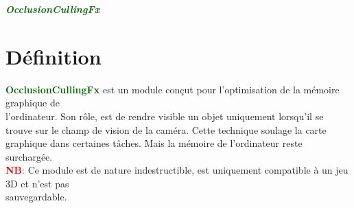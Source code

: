 \documentclass[a4paper, 11pt]{article}
\begin{document}
	\pagecolor{silver}
	\huge{\hspace{12cm}\textit{\textbf{\textcolor{darkgreen}{OcclusionCullingFx}}}}\large{} \tableofcontents
	\newpage
	\section{Définition}
	\textcolor{darkgreen}{\textbf{OcclusionCullingFx}} est un module conçut pour l'optimisation de la 
	mémoire graphique de \\l'ordinateur. Son rôle, est de rendre visible un objet uniquement lorsqu'il se 
	trouve sur le champ de vision de la caméra. Cette technique soulage la carte graphique dans certaines 
	tâches. Mais la mémoire de l'ordinateur reste surchargée.\\
	\textcolor{red}{\textbf{NB}:} Ce module est de nature indestructible, est uniquement compatible à un jeu 
	3D et n'est pas \\sauvegardable.

\end{document}

